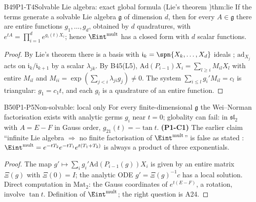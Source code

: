\begin{dimcard}{B49}{P1-T4}{Solvable Lie algebra: exact global formula}{\proved{} (Lie's theorem \cf)}{thm:lie}
If the terms generate a solvable Lie algebra $\mathfrak g$ of dimension $d$, then for every $A\in\mathfrak g$ there are entire functions $g_1,\dots,g_d$, obtained by $d$ quadratures, with $e^{tA}=\prod_{i=1}^de^{g_i(t)X_i}$; hence $\Eint^{\mathrm{mult}}$ has a closed form with $d$ scalar functions.
\end{dimcard}
\begin{proof}
By Lie's theorem there is a basis with $\mathfrak i_k=\spn\{X_k,\dots,X_d\}$ ideals \cf; $\mathrm{ad}_{X_j}$ acts on $\mathfrak i_k/\mathfrak i_{k+1}$ by a scalar $\lambda_{jk}$.
By B45(L5), $\mathrm{Ad}(P_{i-1})X_i=\sum_{l\ge i}M_{il}X_l$ with entire $M_{il}$ and $M_{ii}=\exp(\sum_{j<i}\lambda_{ji}g_j)\ne0$. The system $\sum_{i\le l}g_i'M_{il}=c_l$ is triangular: $g_1=c_1t$, and each $g_l$ is a quadrature of an entire function.
\end{proof}

\begin{dimcard}{B50}{P1-P5}{Non-solvable: local only}{\proved}{}
\label{dim:P1-C1}%
For every finite-dimensional $\mathfrak g$ the Wei--Norman factorisation exists with analytic germs $g_i$ near $t=0$; globality can fail: in $\mathfrak{sl}_2$ with $A=E-F$ in Gauss order, $g_{21}(t)=-\tan t$. \textbf{(P1-C1)} The earlier claim ``infinite Lie algebra $\Rightarrow$ no finite factorisation of $\Eint^{\mathrm{mult}}$'' is false as stated \falsest: $\Eint^{\mathrm{mult}}=e^{-tT_2}e^{-tT_1}e^{t(T_1+T_2)}$ is always a product of three exponentials.
\end{dimcard}
\begin{proof}
The map $g'\mapsto\sum_ig_i'\mathrm{Ad}(P_{i-1}(g))X_i$ is given by an entire matrix $\Xi(g)$ with $\Xi(0)=I$; the analytic ODE $g'=\Xi(g)^{-1}c$ has a local solution.
Direct computation in $\mathrm{Mat}_2$: the Gauss coordinates of $e^{t(E-F)}$, a rotation, involve $\tan t$.
Definition of $\Eint^{\mathrm{mult}}$; the right question is A24.
\end{proof}

